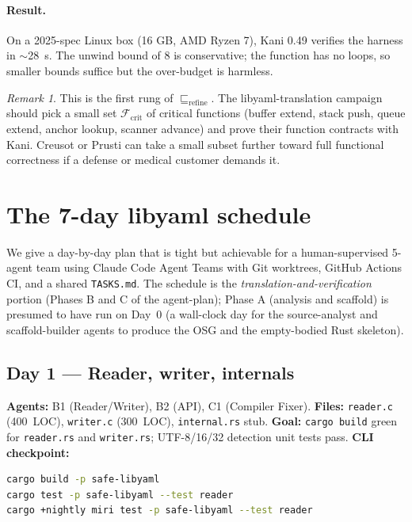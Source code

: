 \documentclass[12pt]{article}
\theoremstyle{definition}
\theoremstyle{remark}
\newtheorem{remark}[theorem]{Remark}
\begin{document}
\paragraph{Result.} On a 2025-spec Linux box (16 GB, AMD Ryzen 7),
Kani 0.49 verifies the harness in $\sim$28~s. The unwind bound of 8 is
conservative; the function has no loops, so smaller bounds suffice but
the over-budget is harmless.

\begin{remark}
This is the first rung of $\sqsubseteq_{\mathrm{refine}}$. The
libyaml-translation campaign should pick a small set
$\mathcal{F}_{\mathrm{crit}}$ of critical functions (buffer extend,
stack push, queue extend, anchor lookup, scanner advance) and prove
their function contracts with Kani. Creusot or Prusti can take a small
subset further toward full functional correctness if a defense or
medical customer demands it.
\end{remark}

\section{The 7-day libyaml schedule}
\label{sec:timeline}

We give a day-by-day plan that is tight but achievable for a
human-supervised 5-agent team using Claude Code Agent Teams
\cite{ferrousbridge2026orchestration} with Git worktrees, GitHub
Actions CI, and a shared \texttt{TASKS.md}. The schedule is the
\emph{translation-and-verification} portion (Phases B and C of the
agent-plan); Phase A (analysis and scaffold) is presumed to have run
on Day~0 (a wall-clock day for the source-analyst and scaffold-builder
agents to produce the OSG and the empty-bodied Rust skeleton).

\subsection*{Day 1 --- Reader, writer, internals}
\textbf{Agents:} B1 (Reader/Writer), B2 (API), C1 (Compiler Fixer).
\textbf{Files:} \texttt{reader.c} (400~LOC), \texttt{writer.c}
(300~LOC), \texttt{internal.rs} stub.
\textbf{Goal:} \texttt{cargo build} green for \texttt{reader.rs} and
\texttt{writer.rs}; UTF-8/16/32 detection unit tests pass.
\textbf{CLI checkpoint:}
\begin{lstlisting}[language=bash]
cargo build -p safe-libyaml
cargo test -p safe-libyaml --test reader
cargo +nightly miri test -p safe-libyaml --test reader
\end{lstlisting}
\end{document}

